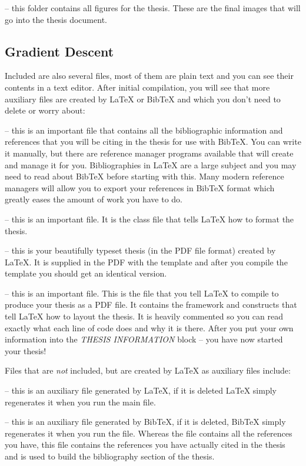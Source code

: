  -- this folder contains all figures for the thesis. These are the final images that will go into the thesis document.

\subsection{Gradient Descent}

Included are also several files, most of them are plain text and you can see their contents in a text editor. After initial compilation, you will see that more auxiliary files are created by \LaTeX{} or BibTeX and which you don't need to delete or worry about:

 -- this is an important file that contains all the bibliographic information and references that you will be citing in the thesis for use with BibTeX. You can write it manually, but there are reference manager programs available that will create and manage it for you. Bibliographies in \LaTeX{} are a large subject and you may need to read about BibTeX before starting with this. Many modern reference managers will allow you to export your references in BibTeX format which greatly eases the amount of work you have to do.

 -- this is an important file. It is the class file that tells \LaTeX{} how to format the thesis.

 -- this is your beautifully typeset thesis (in the PDF file format) created by \LaTeX{}. It is supplied in the PDF with the template and after you compile the template you should get an identical version.

 -- this is an important file. This is the file that you tell \LaTeX{} to compile to produce your thesis as a PDF file. It contains the framework and constructs that tell \LaTeX{} how to layout the thesis. It is heavily commented so you can read exactly what each line of code does and why it is there. After you put your own information into the \emph{THESIS INFORMATION} block -- you have now started your thesis!

Files that are \emph{not} included, but are created by \LaTeX{} as auxiliary files include:

 -- this is an auxiliary file generated by \LaTeX{}, if it is deleted \LaTeX{} simply regenerates it when you run the main  file.

 -- this is an auxiliary file generated by BibTeX, if it is deleted, BibTeX simply regenerates it when you run the  file. Whereas the  file contains all the references you have, this  file contains the references you have actually cited in the thesis and is used to build the bibliography section of the thesis.

